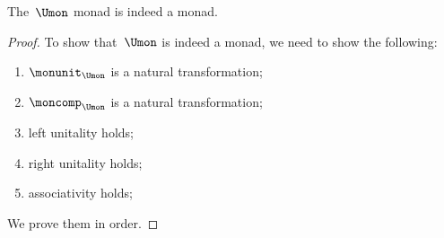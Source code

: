 \begin{lemma}
    The~$\Umon$ monad is indeed a monad.
\end{lemma}
\begin{proof}
    To show that~$\Umon$ is indeed a monad, we need to show the following:
    \begin{enumerate}
        \item $\monunit_{\Umon}$ is a natural transformation;
        \item $\moncomp_{\Umon}$ is a natural transformation;
        \item left unitality holds;
        \item right unitality holds;
        \item associativity holds;
    \end{enumerate}
    We prove them in order.


\end{proof}
